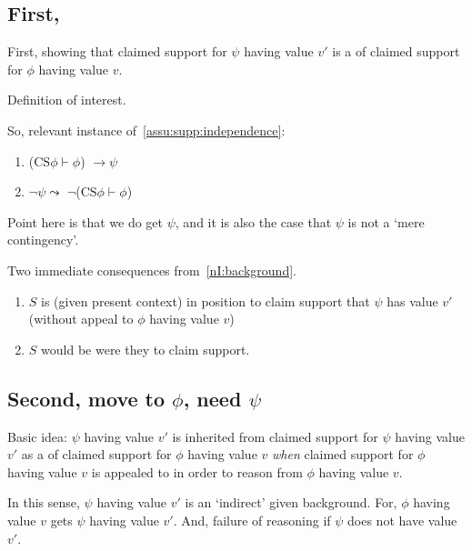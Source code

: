 \subsection{First, \requ{}}

\begin{note}
  First, showing that claimed support for \(\psi\) having value \(v'\) is a \requ{} of claimed support for \(\phi\) having value \(v\).

  \begin{note}
    Definition of interest.
    \begin{quote}
      \vspace{-\baselineskip}
    \end{quote}
  \end{note}
\end{note}

\begin{note}
  So, relevant instance of~\autoref{assu:supp:independence}:
  \begin{enumerate}
  \item (\(\text{CS}\phi \vdash \phi\)) \(\rightarrow \psi\)
  \item \(\lnot\psi \leadsto\) \(\lnot\)(\(\text{CS}\phi \vdash \phi\))
  \end{enumerate}

  Point here is that we do get \(\psi\), and it is also the case that \(\psi\) is not a `mere contingency'.
\end{note}

\begin{note}
  Two immediate consequences from~\ref{nI:background}.
  \begin{enumerate}
  \item \(S\) is (given present context) in position to claim support that \(\psi\) has value \(v'\) (without appeal to \(\phi\) having value \(v\))
  \item \(S\) would be \nmom{} were they to claim support.
  \end{enumerate}
\end{note}

\subsection{Second, move to \(\phi\), need \(\psi\)}

\begin{note}
  Basic idea:
  \(\psi\) having value \(v'\) is inherited from claimed support for \(\psi\) having value \(v'\) as a \requ{} of claimed support for \(\phi\) having value \(v\) \emph{when} claimed support for \(\phi\) having value \(v\) is appealed to in order to reason from \(\phi\) having value \(v\).

  In this sense, \(\psi\) having value \(v'\) is an `indirect' \requ{} given background.
  For, \(\phi\) having value \(v\) gets \(\psi\) having value \(v'\).
  And, failure of reasoning if \(\psi\) does not have value \(v'\).
\end{note}

